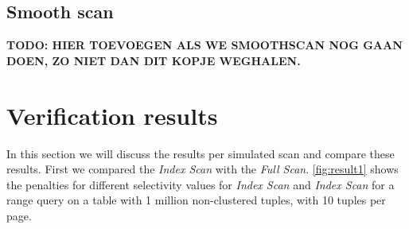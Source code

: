 \documentclass[a4paper,11pt,twoside]{article}
\begin{document}
\subsection{Smooth scan}
\textbf{TODO: HIER TOEVOEGEN ALS WE SMOOTHSCAN NOG GAAN DOEN, ZO NIET DAN DIT KOPJE WEGHALEN.}


\section{Verification results}
In this section we will discuss the results per simulated scan and compare these results. First we compared the \textit{Index Scan} with the \textit{Full Scan}. \autoref{fig:result1} shows the penalties for different selectivity values for \textit{Index Scan} and \textit{Index Scan} for a range query on a table with 1 million non-clustered tuples, with 10 tuples per page. \\
\end{document}
